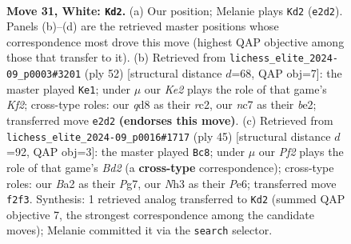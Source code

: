 \documentclass[11pt]{article}
\begin{document}
\begin{figure}[p]\centering
\begin{subfigure}{0.46\textwidth}\centering
\resizebox{\linewidth}{!}{%
\newchessgame
\chessboard[
  setfen={3q3r/2n2pk1/p5p1/n1Q1p2p/P3P1b1/N1PP3N/B3KPPP/R7 w - - 1 31},
  showmover=false,
  pgfstyle=straightmove, color=movearrow, markmove={e2-d2}
]}
\caption{}
\end{subfigure}\hfill
\begin{subfigure}{0.46\textwidth}\centering
\resizebox{\linewidth}{!}{%
\newchessgame
\chessboard[
  setfen={6k1/2q2ppp/1p1Np3/p3P3/Pn1R1P2/1Q4P1/1Pr1bKBP/8 w - - 3 27},
  showmover=false,
  pgfstyle=straightmove, color=movearrow, markmove={f2-e1}
]}
\caption{}
\end{subfigure}
\\[4pt]
\begin{subfigure}{0.46\textwidth}\centering
\resizebox{\linewidth}{!}{%
\newchessgame
\chessboard[
  setfen={3k3r/p2b2pp/npp1pp1n/8/2P1q3/Q1B2N2/PP3PPP/3B1K1R b - - 15 23},
  showmover=false,
  pgfstyle=straightmove, color=movearrow, markmove={d7-c8}
]}
\caption{}
\end{subfigure}\hfill

\caption{\textbf{Move 31, White: \texttt{Kd2}.} (a) Our position; Melanie plays \texttt{Kd2} (\texttt{e2d2}). Panels (b)--(d) are the retrieved master positions whose correspondence most drove this move (highest QAP objective among those that transfer to it). (b) Retrieved from \texttt{lichess\_elite\_2024-09\_p0003\#3201} (ply 52) [structural distance $d$=68, QAP obj=7]: the master played \texttt{Ke1}; under $\mu$ our \emph{Ke2} plays the role of that game's \emph{Kf2}; cross-type roles: our \emph{q}d8 as their \emph{r}c2, our \emph{n}c7 as their \emph{b}e2; transferred move \texttt{e2d2} \textbf{(endorses this move)}. (c) Retrieved from \texttt{lichess\_elite\_2024-09\_p0016\#1717} (ply 45) [structural distance $d$=92, QAP obj=3]: the master played \texttt{Bc8}; under $\mu$ our \emph{Pf2} plays the role of that game's \emph{Bd2} (a \textbf{cross-type} correspondence); cross-type roles: our \emph{B}a2 as their \emph{P}g7, our \emph{N}h3 as their \emph{P}e6; transferred move \texttt{f2f3}. Synthesis: 1 retrieved analog transferred to \texttt{Kd2} (summed QAP objective 7, the strongest correspondence among the candidate moves); Melanie committed it via the \texttt{search} selector.}
\label{fig:thought-m60}
\end{figure}

\clearpage
\end{document}
